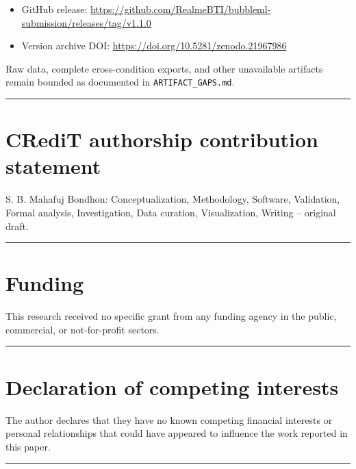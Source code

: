 \documentclass[preprint,12pt]{elsarticle}
\providecommand{\tightlist}{\setlength{\itemsep}{0pt}\setlength{\parskip}{0pt}}
\begin{document}
\begin{itemize}
\tightlist
\item
  GitHub release: \url{https://github.com/RealmeBTI/bubbleml-submission/releases/tag/v1.1.0}
\item
  Version archive DOI: \url{https://doi.org/10.5281/zenodo.21967986}
\end{itemize}

Raw data, complete cross-condition exports, and other unavailable
artifacts remain bounded as documented in \texttt{ARTIFACT\_GAPS.md}.

\begin{center}\rule{0.5\linewidth}{0.5pt}\end{center}

\section*{CRediT authorship contribution
statement}\label{credit-authorship-contribution-statement}

S. B. Mahafuj Bondhon: Conceptualization, Methodology, Software,
Validation, Formal analysis, Investigation, Data curation,
Visualization, Writing -- original draft.

\begin{center}\rule{0.5\linewidth}{0.5pt}\end{center}

\section*{Funding}\label{funding}

This research received no specific grant from any funding agency in the
public, commercial, or not-for-profit sectors.

\begin{center}\rule{0.5\linewidth}{0.5pt}\end{center}

\section*{Declaration of competing
interests}\label{declaration-of-competing-interests}

The author declares that they have no known competing financial
interests or personal relationships that could have appeared to
influence the work reported in this paper.

\begin{center}\rule{0.5\linewidth}{0.5pt}\end{center}
\end{document}
